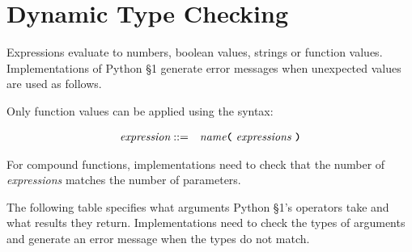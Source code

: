 
\section{Dynamic Type Checking}

Expressions evaluate to numbers, boolean values, strings or function values. Implementations
of Python \S 1 generate error messages when unexpected values are used as follows.

Only function values can be applied using the syntax:

\begin{eqnarray*}
 \textit{expression}    
                                   & ::=   &  \textit{name}
                                               \texttt{\textbf{(}}\  \textit{expressions} \
                                               \texttt{\textbf{)}}\\ 
\end{eqnarray*}

For compound functions, implementations need to check that the number of \textit{expressions}
matches the number of parameters.

The following table specifies what arguments  Python \S 1's operators
take and what results they return. Implementations need to check the types of arguments and
generate an error message when the types do not match.


